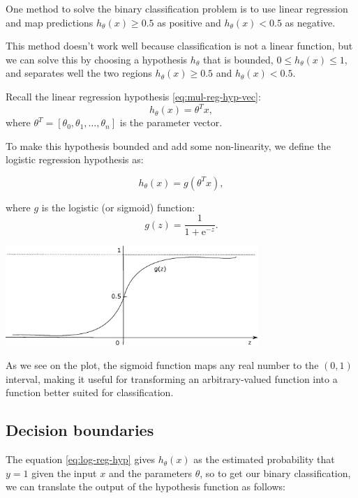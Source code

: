 \documentclass[a4paper,11pt]{report}
\begin{document}
One method to solve the binary classification problem is to use linear regression and map predictions $h_\theta(x)\geq 0.5$ as positive and $h_\theta(x) < 0.5$ as negative.

This method doesn't work well because classification is not a linear function, but we can solve this by choosing a hypothesis $h_\theta$ that is bounded, $0 \leq h_\theta (x) \leq 1$, and separates well the two regions $h_\theta(x)\geq 0.5$ and $h_\theta(x) < 0.5$.

Recall the linear regression hypothesis \eqref{eq:mul-reg-hyp-vec}: $$h_\theta(x) = \theta^Tx,$$ where $\theta^T = [\theta_0, \theta_1, \ldots, \theta_n]$ is the parameter vector.

To make this hypothesis bounded and add some non-linearity, we define the logistic regression hypothesis as:

\begin{equation}\label{eq:log-reg-hyp}
h_\theta(x) = g(\theta^Tx),
\end{equation}

where $g$ is the logistic (or sigmoid) function: $$g(z) = \dfrac{1}{1+\mathrm{e}^{-z}}.$$

\begin{center}
\includegraphics[height = 1.5in]{ml_images/sigmoid}
\end{center}

As we see on the plot, the sigmoid function maps any real number to the $(0, 1)$ interval, making it useful for transforming an arbitrary-valued function into a function better suited for classification.

\subsection*{Decision boundaries}

The equation \eqref{eq:log-reg-hyp} gives $h_\theta(x)$ as the estimated probability that $y=1$ given the input $x$ and the parameters $\theta$, so to get our binary classification, we can translate the output of the hypothesis function as follows:
\end{document}
